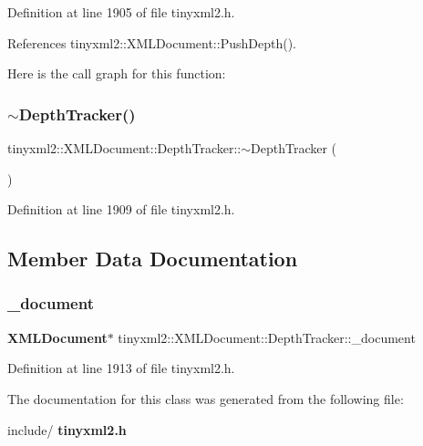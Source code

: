 Definition at line 1905 of file tinyxml2.\+h.



References tinyxml2\+::\+X\+M\+L\+Document\+::\+Push\+Depth().

Here is the call graph for this function\+:
\mbox{\label{classtinyxml2_1_1_x_m_l_document_1_1_depth_tracker_a0a5bde3f2443c73b833852c43dd2b1d6}} 
\subsubsection{$\sim$\+Depth\+Tracker()}
{\footnotesize\ttfamily tinyxml2\+::\+X\+M\+L\+Document\+::\+Depth\+Tracker\+::$\sim$\+Depth\+Tracker (\begin{DoxyParamCaption}{ }\end{DoxyParamCaption})\hspace{0.3cm}{\ttfamily [inline]}}



Definition at line 1909 of file tinyxml2.\+h.



\subsection{Member Data Documentation}
\mbox{\label{classtinyxml2_1_1_x_m_l_document_1_1_depth_tracker_ab142a47709c83a3698af1470378b9385}} 
\subsubsection{\+\_\+document}
{\footnotesize\ttfamily \textbf{ X\+M\+L\+Document}$\ast$ tinyxml2\+::\+X\+M\+L\+Document\+::\+Depth\+Tracker\+::\+\_\+document\hspace{0.3cm}{\ttfamily [private]}}



Definition at line 1913 of file tinyxml2.\+h.



The documentation for this class was generated from the following file\+:\begin{DoxyCompactItemize}
\item 
include/\textbf{ tinyxml2.\+h}\end{DoxyCompactItemize}
